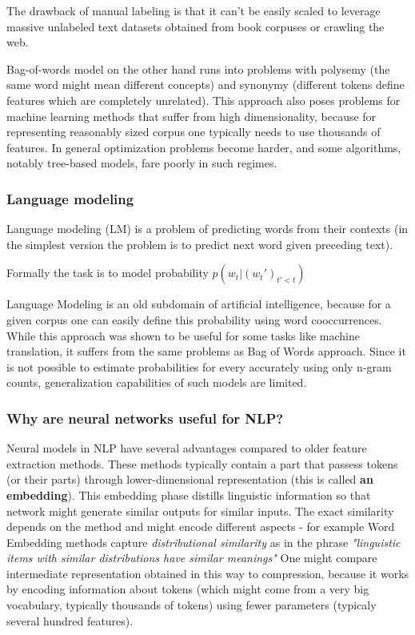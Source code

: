 \documentclass[longabstract,mgr,english]{iithesis}
\begin{document}
The drawback of manual labeling is that it can't be easily scaled to leverage massive unlabeled text datasets obtained from book corpuses or crawling the web.

Bag-of-words model on the other hand runs into problems with polysemy (the same word might mean different concepts) and synonymy (different tokens define features which are completely unrelated).
This approach also poses problems for machine learning methods that suffer from high dimensionality, because for representing reasonably sized corpus one typically needs to use thousands of features.
In general optimization problems become harder, and some algorithms, notably tree-based models, fare poorly in such regimes. 

\subsubsection{Language modeling}


Language modeling (LM) is a problem of predicting words from their contexts (in the simplest version the problem is to predict next word given preceding text).

Formally the task is to model probability \(p(w_t | (w_t')_{t' < t})\)

Language Modeling is an old subdomain of artificial intelligence, because for a given corpus one can easily define this probability using word cooccurrences.
While this approach was shown to be useful for some tasks like machine translation, it suffers from the same problems as Bag of Words approach. Since it is not possible to estimate probabilities for every accurately
using only n-gram counts, generalization capabilities of such models are limited.

\subsubsection{Why are neural networks useful for NLP?}


Neural models in NLP have several advantages compared to older feature extraction methods.
These methods typically contain a part that passess tokens (or their parts) through lower-dimensional representation (this is called \textbf{an embedding}).
This embedding phase distills linguistic information so that network might generate similar outputs for similar inputs.
The exact similarity depends on the method and might encode different aspects - for example Word Embedding methods capture \emph{distributional similarity} as in the phrase \emph{"linguistic items with similar distributions have similar meanings"}
One might compare intermediate representation obtained in this way to compression, because it works by encoding information about tokens (which might come from a very big vocabulary, typically thousands of tokens)
using fewer parameters (typicaly several hundred features).
\end{document}
